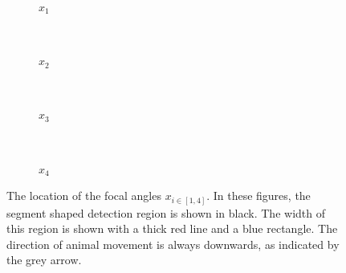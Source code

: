 \documentclass[a4paper,10pt,reqno,oneside]{amsart}
\begin{document}
\begin{figure}[t]
        \centering
        \begin{subfigure}[t]{0.34\textwidth}
                \centering
                \caption{$x_1$}
                \label{f:tikz1}
        \end{subfigure}
        ~ 
        \begin{subfigure}[t]{0.22\textwidth}
                \centering
                \caption{$x_2$}
                \label{f:x2}
        \end{subfigure}
        ~ 
	\begin{subfigure}[t]{0.22\textwidth}
                \centering
                \caption{$x_3$}
                \label{f:x3}
        \end{subfigure}%
	~
	\begin{subfigure}[t]{0.22\textwidth}
                \centering
                \caption{$x_4$}
                \label{f:x4}
        \end{subfigure}%
\caption{The location of the focal angles $x_{i\in[1,4]}$. In these figures, the segment shaped detection region is shown in black. The width of this region is shown with a thick red line and a blue rectangle. The direction of animal movement is always downwards, as indicated by the grey arrow.}
\label{f:xis}
\end{figure}
\end{document}
